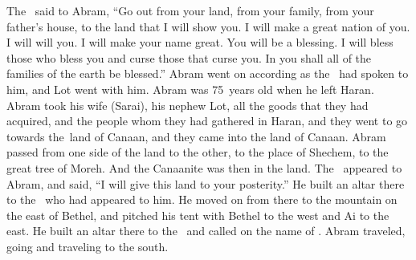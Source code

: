 
\begin{inparaenum}
   The \lord\ said to Abram, ``Go out from your land, from your family, from your father's house, to the land that I will show you.%
   I will make a great nation of you. I will will you. I will make your name great. You will be a blessing.%
   I will bless those who bless you and curse those that curse you. In you shall all of the families of the earth be blessed.''%
   Abram went on according as the \lord\ had spoken to him, and Lot went with him. Abram was 75~years old when he left Haran.%
   Abram took his wife (Sarai), his nephew Lot, all the goods that they had acquired, and the people whom they had gathered in Haran, and they went to go towards the\understood{}\ land of Canaan, and they came into the land of Canaan.%
   Abram passed from one side of the land to the other, to the place of Shechem, to the great tree of Moreh. And the Canaanite was then in the land.%
   The \lord\ appeared to Abram, and said, ``I will give this land to your posterity.'' He built an altar there to the \lord\ who had appeared to him.%
   He moved on from there to the mountain on the east of Bethel, and pitched his tent with Bethel to the west and Ai to the east. He built an altar there to the \lord\ and called on the name of \god.%
   Abram traveled, going and traveling to the south.%


\end{inparaenum}
